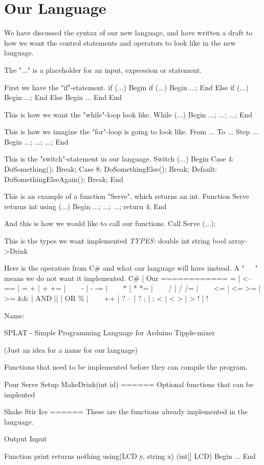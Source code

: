 \chapter{Our Language}
We have discussed the syntax of our new language, and have written a draft to how we want the control statements and operators to look like in the new language.

The "..." is a placeholder for an input, expression or statement.

First we have the "if"-statement.
if (...)
Begin
	if (...)
	Begin
		...;
	End
	Else if (...)
	Begin
		...;
	End
	Else
	Begin
	...
	End
End

This is how we want the "while"-loop look like.
While (...)
Begin
	...;
	...;
	...;
End
	
This is how we imagine the "for"-loop is going to look like.
From ... To ... Step ...
Begin
	...;
	...;
	...;
End

This is the "switch"-statement in our language.
Switch (...)
Begin
	Case 4:
		DoSomething();
		Break;
	Case 8:
		DoSomethingElse();
		Break;
	Default:
		DoSomethingElseAgain();
	Break;
End

This is an example of a function "Serve", which returns an int.
Function Serve returns int using (...)
Begin
	...;
	...;
	...;
	return 4;
End

And this is how we would like to call our functions.
Call Serve (...);

This is the types we want implemented
\textit{TYPES:}
double
int
string
bool
array->Drink

Here is the operators from C\# and what our language will have instead. A "~~~" means we do not want it implemented.
C\#	|	Our
============
=  	|	<--
==	|	=
+	|	+
+=	|	~~~
-	|	-
-=	|	~~~
*	|	*
*=	|	~~~
/	|	/
/=	|	~~~
<=	|	<=
>=	|	>=
&&	|	AND
||	|	OR
\%	|	~~~
++	|	?
--	|	?
;	|	;
<	|	<
>	|	>
!	|	!


Name:

SPLAT - Simple Programming Language for Arduino Tipple-mixer


(Just an idea for a name for our language)







Functions that need to be implemented before they can compile the program.

Pour
Serve
Setup
MakeDrink(int id)
======
Optional functions that can be implented

Shake
Stir
Ice
======
These are the functions already implemented in the language.

Output
Input

Function print returns nothing using(LCD y, string x)     (int[] LCD)
Begin
	...
End